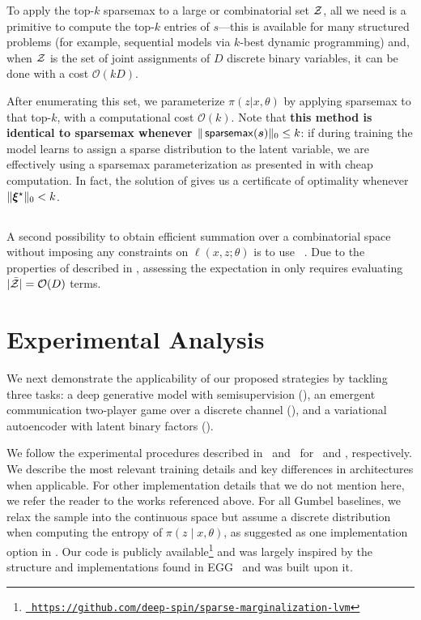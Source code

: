 To apply the top-$k$ sparsemax to a large or combinatorial set $\mathcal{Z}$,
all we need is a primitive to compute the top-$k$ entries of
$s$---this is available for many structured problems (for example,
sequential models via $k$-best dynamic programming) and, when $\mathcal{Z}$
is the set of joint assignments of $D$ discrete binary variables, it
can be done with a cost $\mathcal{O}(kD)$.

After enumerating this set, we parameterize $\pi(z|x,\theta)$ by
applying sparsemax to that top-$k$, with a
computational cost $\mathcal{O}(k)$. Note that {\bf this method is
        identical to sparsemax whenever $\|\operatorname*{\mathsf{sparsemax}}(\bm{s})\|_0 \le k$}: if
during training the model learns to assign a sparse distribution to
the latent variable, we are effectively using a sparsemax
parameterization as presented in  with cheap
computation. In fact, the solution of 
gives us a certificate of optimality whenever $\|\bm{\xi}^\star\|_0 < k$.

\subsection{\label{sec:smap}\smap}

A second possibility to obtain efficient summation over a
combinatorial space without imposing any constraints on $\ell(x, z;
    \theta)$ is to use \smap~\citep{niculae2018sparsemap, sparsemapcg}.
Due to the properties of \smap described in ,
assessing the expectation in  only requires evaluating
$|\bar{\mathcal{Z}}| = \mathcal{O}(D)$ terms.

\section{\label{sec:applications}Experimental Analysis}

We next demonstrate the applicability of our proposed strategies by
tackling three tasks: a deep generative model with semisupervision
(), an emergent communication two-player game over a
discrete channel (), and a variational autoencoder with
latent binary factors ().

We follow the experimental procedures described
in~\citep{RB19} and~\citep{Lazaridou2017} for~ and
, respectively. We describe the most relevant
training details and key differences in architectures when
applicable. For other implementation details that we do not mention
here, we refer the reader to the works referenced above. For all
Gumbel baselines, we relax the sample into the continuous space but
assume a discrete distribution when computing the entropy of $\pi(z
    \mid x, \theta)$, as suggested as one implementation option in
\citet{Concrete}. Our code is publicly available\footnote{
    \href{https://github.com/deep-spin/sparse-marginalization-lvm}{\tt
        https://github.com/deep-spin/sparse-marginalization-lvm}} and was
largely inspired by the structure and implementations found in
EGG~\citep{Kharitonov2019} and was built upon it.

